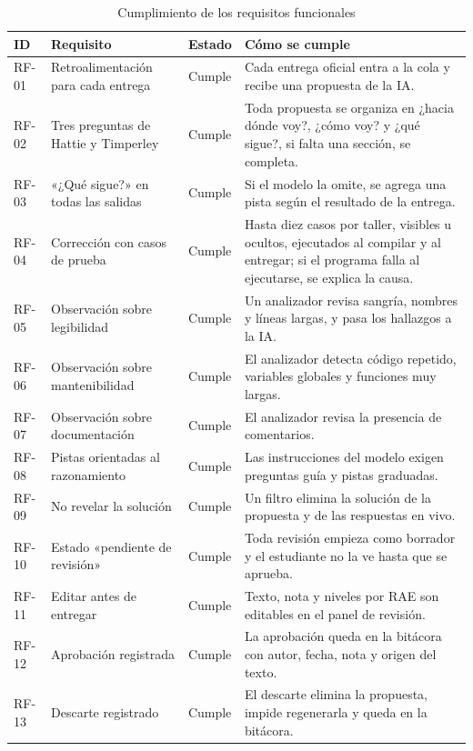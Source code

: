 \documentclass[letterpaper, 10 pt, conference]{ieeeconf}
\begin{document}
\begin{table}[t]
\centering
\footnotesize
\caption{Cumplimiento de los requisitos funcionales}
\label{tab:cumplimiento}
\begin{tabular}{|p{1.2cm}|p{4.6cm}|p{2.2cm}|p{8.2cm}|}
\hline
\textbf{ID} & \textbf{Requisito} & \textbf{Estado} & \textbf{Cómo se cumple} \\
\hline
RF-01 & Retroalimentación para cada entrega & Cumple & Cada entrega oficial entra a la cola y recibe una propuesta de la IA. \\ \hline
RF-02 & Tres preguntas de Hattie y Timperley & Cumple & Toda propuesta se organiza en ¿hacia dónde voy?, ¿cómo voy? y ¿qué sigue?, si falta una sección, se completa. \\ \hline
RF-03 & «¿Qué sigue?» en todas las salidas & Cumple & Si el modelo la omite, se agrega una pista según el resultado de la entrega. \\ \hline
RF-04 & Corrección con casos de prueba & Cumple & Hasta diez casos por taller, visibles u ocultos, ejecutados al compilar y al entregar; si el programa falla al ejecutarse, se explica la causa. \\ \hline
RF-05 & Observación sobre legibilidad & Cumple & Un analizador revisa sangría, nombres y líneas largas, y pasa los hallazgos a la IA. \\ \hline
RF-06 & Observación sobre mantenibilidad & Cumple & El analizador detecta código repetido, variables globales y funciones muy largas. \\ \hline
RF-07 & Observación sobre documentación & Cumple & El analizador revisa la presencia de comentarios. \\ \hline
RF-08 & Pistas orientadas al razonamiento & Cumple & Las instrucciones del modelo exigen preguntas guía y pistas graduadas. \\ \hline
RF-09 & No revelar la solución & Cumple & Un filtro elimina la solución de la propuesta y de las respuestas en vivo. \\ \hline
RF-10 & Estado «pendiente de revisión» & Cumple & Toda revisión empieza como borrador y el estudiante no la ve hasta que se aprueba. \\ \hline
RF-11 & Editar antes de entregar & Cumple & Texto, nota y niveles por RAE son editables en el panel de revisión. \\ \hline
RF-12 & Aprobación registrada & Cumple & La aprobación queda en la bitácora con autor, fecha, nota y origen del texto. \\ \hline
RF-13 & Descarte registrado & Cumple & El descarte elimina la propuesta, impide regenerarla y queda en la bitácora. \\ \hline

\end{tabular}
\end{table}
\end{document}
